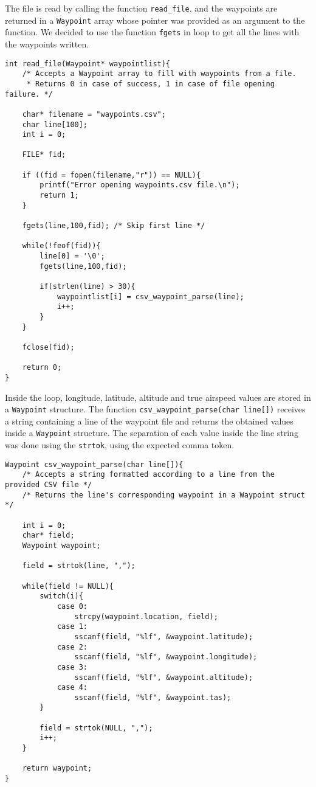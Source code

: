 \documentclass{article}
\begin{document}
The file is read by calling the function \texttt{read_file}, and the waypoints are returned in a \texttt{Waypoint} array whose pointer was provided as an argument to the function. We decided to use the function \texttt{fgets} in loop to get all the lines with the waypoints written.
\begin{verbatim}
int read_file(Waypoint* waypointlist){
    /* Accepts a Waypoint array to fill with waypoints from a file.
     * Returns 0 in case of success, 1 in case of file opening failure. */
    
    char* filename = "waypoints.csv";
    char line[100];
    int i = 0;
    
    FILE* fid;
    
    if ((fid = fopen(filename,"r")) == NULL){
        printf("Error opening waypoints.csv file.\n");
        return 1;
    }
    
    fgets(line,100,fid); /* Skip first line */
    
    while(!feof(fid)){
        line[0] = '\0';
        fgets(line,100,fid);
        
        if(strlen(line) > 30){
            waypointlist[i] = csv_waypoint_parse(line);
            i++;
        }
    }
    
    fclose(fid);
    
    return 0;
}
\end{verbatim}
Inside the loop, longitude, latitude, altitude and true airspeed values are stored in a \texttt{Waypoint} structure. The function \texttt{csv_waypoint_parse(char line[])} receives a string containing a line of the waypoint file and returns the obtained values inside a \texttt{Waypoint} structure. The separation of each value inside the line string was done using the \texttt{strtok}, using the expected comma token.
\begin{verbatim}
Waypoint csv_waypoint_parse(char line[]){
    /* Accepts a string formatted according to a line from the provided CSV file */
    /* Returns the line's corresponding waypoint in a Waypoint struct */
    
    int i = 0;
    char* field;
    Waypoint waypoint;
    
    field = strtok(line, ",");
    
    while(field != NULL){
        switch(i){
            case 0:
                strcpy(waypoint.location, field);
            case 1:
                sscanf(field, "%lf", &waypoint.latitude);
            case 2:
                sscanf(field, "%lf", &waypoint.longitude);
            case 3:
                sscanf(field, "%lf", &waypoint.altitude);
            case 4:
                sscanf(field, "%lf", &waypoint.tas);
        }
        
        field = strtok(NULL, ",");
        i++;
    }
    
    return waypoint;
}
\end{verbatim}
\end{document}
